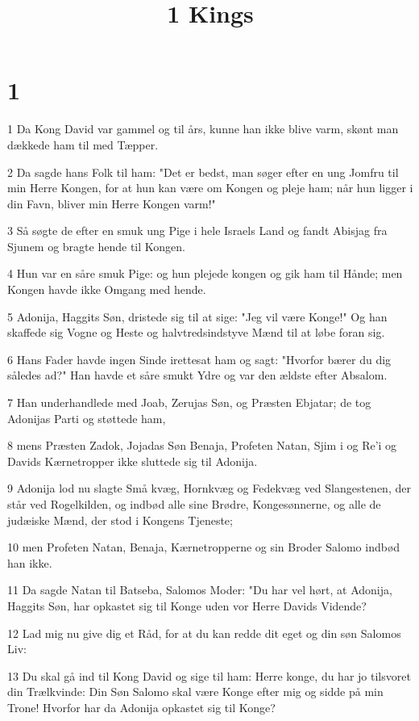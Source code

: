 

\title{1 Kings}


\chapter{1}

\par 1 Da Kong David var gammel og til års, kunne han ikke blive varm, skønt man dækkede ham til med Tæpper.
\par 2 Da sagde hans Folk til ham: "Det er bedst, man søger efter en ung Jomfru til min Herre Kongen, for at hun kan være om Kongen og pleje ham; når hun ligger i din Favn, bliver min Herre Kongen varm!"
\par 3 Så søgte de efter en smuk ung Pige i hele Israels Land og fandt Abisjag fra Sjunem og bragte hende til Kongen.
\par 4 Hun var en såre smuk Pige: og hun plejede kongen og gik ham til Hånde; men Kongen havde ikke Omgang med hende.
\par 5 Adonija, Haggits Søn, dristede sig til at sige: "Jeg vil være Konge!" Og han skaffede sig Vogne og Heste og halvtredsindstyve Mænd til at løbe foran sig.
\par 6 Hans Fader havde ingen Sinde irettesat ham og sagt: "Hvorfor bærer du dig således ad?" Han havde et såre smukt Ydre og var den ældste efter Absalom.
\par 7 Han underhandlede med Joab, Zerujas Søn, og Præsten Ebjatar; de tog Adonijas Parti og støttede ham,
\par 8 mens Præsten Zadok, Jojadas Søn Benaja, Profeten Natan, Sjim i og Re'i og Davids Kærnetropper ikke sluttede sig til Adonija.
\par 9 Adonija lod nu slagte Små kvæg, Hornkvæg og Fedekvæg ved Slangestenen, der står ved Rogelkilden, og indbød alle sine Brødre, Kongesønnerne, og alle de judæiske Mænd, der stod i Kongens Tjeneste;
\par 10 men Profeten Natan, Benaja, Kærnetropperne og sin Broder Salomo indbød han ikke.
\par 11 Da sagde Natan til Batseba, Salomos Moder: "Du har vel hørt, at Adonija, Haggits Søn, har opkastet sig til Konge uden vor Herre Davids Vidende?
\par 12 Lad mig nu give dig et Råd, for at du kan redde dit eget og din søn Salomos Liv:
\par 13 Du skal gå ind til Kong David og sige til ham: Herre konge, du har jo tilsvoret din Trælkvinde: Din Søn Salomo skal være Konge efter mig og sidde på min Trone! Hvorfor har da Adonija opkastet sig til Konge?
